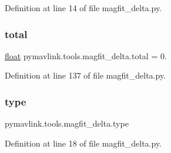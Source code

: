 Definition at line 14 of file magfit\+\_\+delta.\+py.

\mbox{\label{namespacepymavlink_1_1tools_1_1magfit__delta_a07322551a91ae5be6422fba4ec79f9cc}} 
\subsubsection{\texorpdfstring{total}{total}}
{\footnotesize\ttfamily \mbox{\hyperlink{namespacepymavlink_1_1tools_1_1magfit__delta_a25223d75e5d8399cfa9e1902af055a4c}{float}} pymavlink.\+tools.\+magfit\+\_\+delta.\+total = 0.}



Definition at line 137 of file magfit\+\_\+delta.\+py.

\mbox{\label{namespacepymavlink_1_1tools_1_1magfit__delta_a681501cd0f73dd27911da6741369837c}} 
\subsubsection{\texorpdfstring{type}{type}}
{\footnotesize\ttfamily pymavlink.\+tools.\+magfit\+\_\+delta.\+type}



Definition at line 18 of file magfit\+\_\+delta.\+py.

